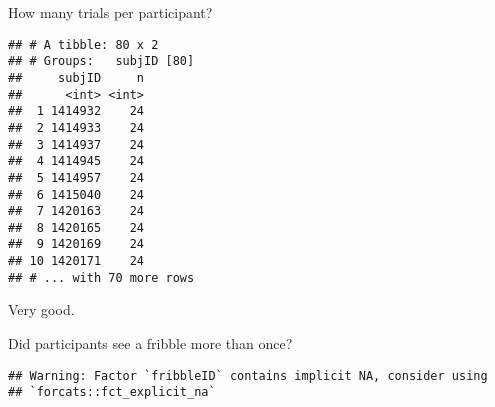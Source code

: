 \documentclass[
]{article}
\newenvironment{Shaded}{\begin{snugshade}}{\end{snugshade}}
\newcommand{\DecValTok}[1]{\textcolor[rgb]{0.00,0.00,0.81}{#1}}
\newcommand{\KeywordTok}[1]{\textcolor[rgb]{0.13,0.29,0.53}{\textbf{#1}}}
\newcommand{\NormalTok}[1]{#1}
\newcommand{\OperatorTok}[1]{\textcolor[rgb]{0.81,0.36,0.00}{\textbf{#1}}}
\newcommand{\StringTok}[1]{\textcolor[rgb]{0.31,0.60,0.02}{#1}}
\begin{document}
\begin{Shaded}
\end{Shaded}

How many trials per participant?

\begin{Shaded}
\end{Shaded}

\begin{verbatim}
## # A tibble: 80 x 2
## # Groups:   subjID [80]
##     subjID     n
##      <int> <int>
##  1 1414932    24
##  2 1414933    24
##  3 1414937    24
##  4 1414945    24
##  5 1414957    24
##  6 1415040    24
##  7 1420163    24
##  8 1420165    24
##  9 1420169    24
## 10 1420171    24
## # ... with 70 more rows
\end{verbatim}

Very good.

Did participants see a fribble more than once?

\begin{Shaded}
\end{Shaded}

\begin{verbatim}
## Warning: Factor `fribbleID` contains implicit NA, consider using
## `forcats::fct_explicit_na`
\end{verbatim}
\end{document}
